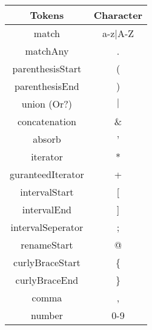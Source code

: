 \begin{tabular}{|c|c|}
    \hline
    \textbf{Tokens} & \textbf{Character}\\
    \hline
    match & a-z$\mid$A-Z\\
    \hline
    matchAny & .\\
    \hline
    parenthesisStart & (\\
    \hline
    parenthesisEnd & )\\
    \hline
    union (Or?) & $\mid$\\
    \hline
    concatenation & \&\\
    \hline
    absorb & '\\
    \hline
    iterator & *\\
    \hline
    guranteedIterator & +\\
    \hline
    intervalStart & [\\
    \hline
    intervalEnd & ]\\
    \hline
    intervalSeperator & ;\\
    \hline
    renameStart & @\\
    \hline
    curlyBraceStart & \{\\
    \hline
    curlyBraceEnd & \}\\
    \hline
    comma & ,\\
    \hline
    number & 0-9\\
    \hline
\end{tabular}